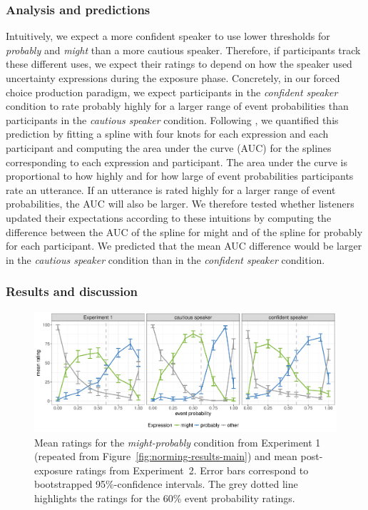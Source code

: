\documentclass[man, floatsintext]{apa6}
\newcommand{\figref}[1]{Figure~\ref{#1}}
\begin{document}
\subsubsection{Analysis and predictions}  

Intuitively, we expect a more confident speaker to use lower thresholds for {\it probably} and {\it might} than a more cautious speaker.
Therefore, if participants track these different uses, we expect their ratings to depend on how the speaker used uncertainty expressions during the exposure phase. 
Concretely,  in our forced choice production paradigm, we expect participants in the \textit{confident speaker} condition to rate {\sc probably} highly for a larger range of event probabilities than participants
in the \textit{cautious speaker} condition. 
Following \cite{Yildirim2016}, we quantified this prediction by fitting a spline with four knots for each expression and each participant and computing the area 
under the curve (AUC) for the splines corresponding to each expression and participant. The area under the curve is proportional to how highly and for how large 
of event probabilities participants rate an utterance. If an utterance is rated highly for a larger range of event probabilities, the AUC will also be larger. 
We therefore tested whether listeners updated their expectations according to these intuitions by computing the difference between the AUC of the spline for 
{\sc might} and of the spline for {\sc probably} for each participant. We predicted that the mean AUC difference would be larger in the 
\emph{cautious speaker} condition than in the \emph{confident speaker} condition.

\subsubsection{Results and discussion}

\begin{figure}
\includegraphics[width=\textwidth]{plots/exp-1-replication-ratings.pdf}
\caption{Mean ratings for the \textit{might-probably} condition from Experiment 1 (repeated from \figref{fig:norming-results-main}) and mean post-exposure ratings from Experiment~2. Error bars correspond to bootstrapped 95\%-confidence intervals.  The grey dotted line highlights the ratings for the 60\% event probability ratings.  \label{fig:adaptation-results-prod}}
\end{figure}
\end{document}

